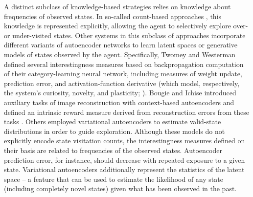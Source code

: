 A distinct subclass of knowledge-based strategies relies on knowledge about frequencies of observed states. In so-called count-based approaches \parencite{bellemare_unifying_2016,tang_exploration_2017}, this knowledge is represented explicitly, allowing the agent to selectively explore over- or under-visited states. Other systems in this subclass of approaches incorporate different variants of autoencoder networks to learn latent spaces \parencite{twomey_curiosity-based_2018,bougie_fast_2020} or generative models \parencite{nair_visual_2018,pong_skew-fit_2020} of states observed by the agent. Specifically, Twomey and Westerman defined several interestingness measures based on backpropagation computation of their category-learning neural network, including measures of weight update, prediction error, and activation-function derivative (which model, respectively, the system’s curiosity, novelty, and plasticity; \cite{twomey_curiosity-based_2018}). Bougie and Ichise introduced auxiliary tasks of image reconstruction with context-based autoencoders and defined an intrinsic reward measure derived from reconstruction errors from these tasks \parencite{bougie_fast_2020}. Others \parencite{nair_visual_2018,pong_skew-fit_2020} employed variational autoencoders to estimate valid-state distributions in order to guide exploration. Although these models do not explicitly encode state visitation counts, the interestingness measures defined on their basis are related to frequencies of the observed states. Autoencoder prediction error, for instance, should decrease with repeated exposure to a given state. Variational autoencoders additionally represent the statistics of the latent space -- a feature that can be used to estimate the likelihood of any state (including completely novel states) given what has been observed in the past. 

